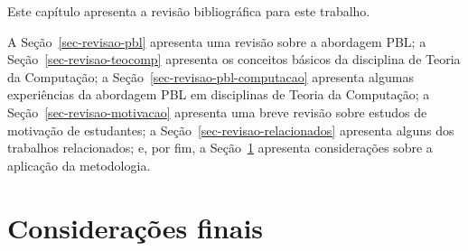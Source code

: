 \label{cap-revisao}
\acresetall

Este capítulo apresenta a revisão bibliográfica para este trabalho.

A Seção~\ref{sec-revisao-pbl} apresenta uma revisão sobre a abordagem \ac{PBL};
a Seção~\ref{sec-revisao-teocomp} apresenta os conceitos básicos da disciplina
de Teoria da Computação;
a Seção~\ref{sec-revisao-pbl-computacao} apresenta algumas experiências da
abordagem \ac{PBL} em disciplinas de Teoria da Computação;
a Seção~\ref{sec-revisao-motivacao} apresenta uma breve revisão sobre
estudos de motivação de estudantes;
a Seção~\ref{sec-revisao-relacionados} apresenta alguns dos trabalhos
relacionados;
e, por fim, a Seção~\ref{sec-revisao-consideracoes} apresenta
considerações sobre a aplicação da metodologia.







\section{Considerações finais}
\label{sec-revisao-consideracoes}
